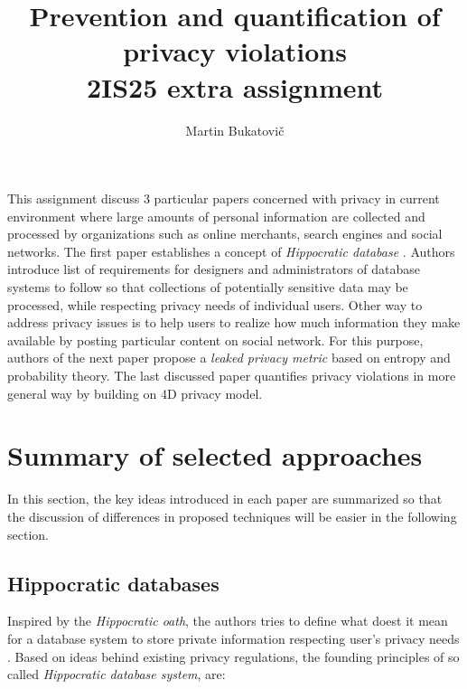 \documentclass[a4paper]{article}
\author{Martin Bukatovič}
\title{
Prevention and quantification of privacy violations\\
\textsc{2IS25} extra assignment
}
\date{}
\begin{document}
\maketitle


This assignment discuss 3 particular papers concerned with privacy 
in current environment where large amounts
of personal information are collected and processed by organizations such
as online merchants, search engines and social networks.
The first paper establishes a concept of \emph{Hippocratic
database} \cite{paper_hdb}. Authors introduce list of requirements for
designers and administrators of database systems to follow so that
collections of potentially sensitive data may be processed, while
respecting privacy needs of individual users.
Other way to address privacy issues is to help users to realize how
much information they make available by posting
particular content on social network.
For this purpose, authors of the next paper \cite{paper_privacy_sns}
propose a \emph{leaked privacy metric} based on entropy and probability theory.
The last discussed paper \cite{paper_qpv} quantifies privacy violations
in more general way by building on 4D privacy model.

\section{Summary of selected approaches}

In this section, the key ideas introduced in each paper are summarized
so that the
discussion of differences in proposed techniques will be easier in the
following section.

\subsection{Hippocratic databases}

Inspired by the \emph{Hippocratic oath}, the authors tries to define what
doest it mean for a database system to store private information respecting
user's privacy needs \cite{paper_hdb}.
Based on ideas behind existing privacy regulations, the founding principles
of so called \emph{Hippocratic database system}, are:
\end{document}
